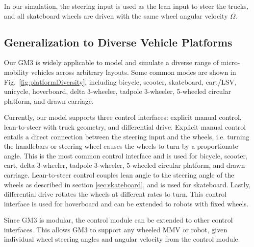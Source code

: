\documentclass[letterpaper, 10 pt, conference]{ieeeconf}  %
\begin{document}
In our simulation, the steering input is used as the lean input to steer the trucks, and all skateboard wheels are driven with the same wheel angular velocity $\Omega$.

\subsection{Generalization to Diverse Vehicle Platforms}

Our GM3 is widely applicable to model and simulate a diverse range of micro-mobility vehicles across arbitrary layouts. Some common modes are shown in Fig.~\ref{fig:platformDiversity}, including bicycle, scooter, skateboard, cart/LSV, unicycle, hoverboard, delta 3-wheeler, tadpole 3-wheeler, 5-wheeled circular platform, and drawn carriage.

Currently, our model supports three control interfaces: explicit manual control, lean-to-steer with truck geometry, and differential drive. Explicit manual control entails a direct connection between the steering input and the wheels, i.e. turning the handlebars or steering wheel causes the wheels to turn by a proportionate angle. This is the most common control interface and is used for bicycle, scooter, cart, delta 3-wheeler, tadpole 3-wheeler, 5-wheeled circular platform, and drawn carriage. Lean-to-steer control couples lean angle to the steering angle of the wheels as described in section \ref{sec:skateboard}, and is used for skateboard. Lastly, differential drive rotates the wheels at different rates to turn. This control interface is used for hoverboard and can be extended to robots with fixed wheels. 

Since GM3 is modular, the control module can be extended to other control interfaces. This allows GM3 to support any wheeled MMV or robot, given individual wheel steering angles and angular velocity from the control module. 
\end{document}
